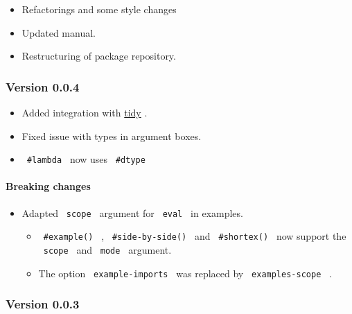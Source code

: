 \begin{itemize}
\tightlist
\item
  Refactorings and some style changes
\item
  Updated manual.
\item
  Restructuring of package repository.
\end{itemize}

\subsubsection{Version 0.0.4}\label{version-0.0.4}

\begin{itemize}
\tightlist
\item
  Added integration with \href{https://github.com/Mc-Zen/tidy}{tidy} .
\item
  Fixed issue with types in argument boxes.
\item
  \texttt{\ \#lambda\ } now uses \texttt{\ \#dtype\ }
\end{itemize}

\paragraph{Breaking changes}\label{breaking-changes}

\begin{itemize}
\tightlist
\item
  Adapted \texttt{\ scope\ } argument for \texttt{\ eval\ } in examples.

  \begin{itemize}
  \tightlist
  \item
    \texttt{\ \#example()\ } , \texttt{\ \#side-by-side()\ } and
    \texttt{\ \#shortex()\ } now support the \texttt{\ scope\ } and
    \texttt{\ mode\ } argument.
  \item
    The option \texttt{\ example-imports\ } was replaced by
    \texttt{\ examples-scope\ } .
  \end{itemize}
\end{itemize}

\subsubsection{Version 0.0.3}\label{version-0.0.3}

